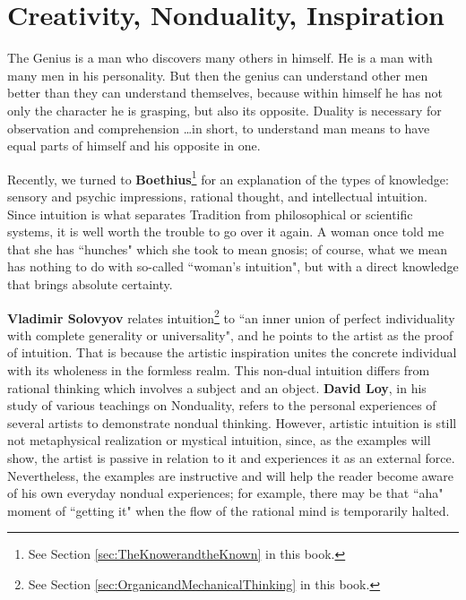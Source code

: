 \section{Creativity, Nonduality, Inspiration}

\begin{quotex}
The Genius is a man who discovers many others in himself. He is a man with many men in his personality. But then the genius can understand other men better than they can understand themselves, because within himself he has not only the character he is grasping, but also its opposite. Duality is necessary for observation and comprehension …in short, to understand man means to have equal parts of himself and his opposite in one. 

\end{quotex}


Recently, we turned to \textbf{Boethius}\footnote{See Section \ref{sec:TheKnowerandtheKnown} in this book.} for an explanation of the types of knowledge: sensory and psychic impressions, rational thought, and intellectual intuition. Since intuition is what separates Tradition from philosophical or scientific systems, it is well worth the trouble to go over it again. A woman once told me that she has ``hunches" which she took to mean gnosis; of course, what we mean has nothing to do with so-called ``woman's intuition", but with a direct knowledge that brings absolute certainty.

\textbf{Vladimir Solovyov} relates intuition\footnote{See Section \ref{sec:OrganicandMechanicalThinking} in this book.} to ``an inner union of perfect individuality with complete generality or universality", and he points to the artist as the proof of intuition. That is because the artistic inspiration unites the concrete individual with its wholeness in the formless realm. This non-dual intuition differs from rational thinking which involves a subject and an object. \textbf{David Loy}, in his study of various teachings on Nonduality, refers to the personal experiences of several artists to demonstrate nondual thinking. However, artistic intuition is still not metaphysical realization or mystical intuition, since, as the examples will show, the artist is passive in relation to it and experiences it as an external force. Nevertheless, the examples are instructive and will help the reader become aware of his own everyday nondual experiences; for example, there may be that ``aha" moment of ``getting it" when the flow of the rational mind is temporarily halted.

